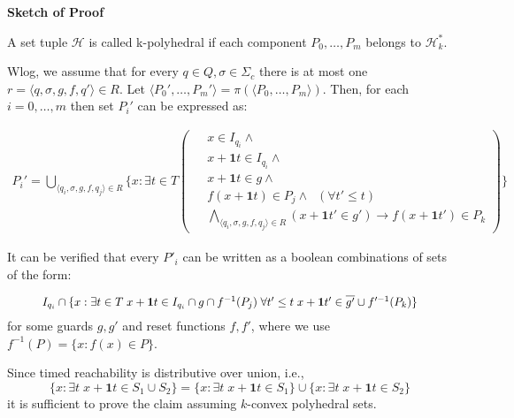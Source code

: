 \documentclass[table]{beamer}
\begin{document}
\begin{frame}
	\textbf{Sketch of Proof}
	
	\medskip

	A set tuple $\mathcal{H}$ is called k-polyhedral if each component $P_0,\ldots,P_m$ belongs to $\mathcal{H}^*_k$.

	Wlog, we assume that for every $q \in Q,\sigma \in \Sigma_c$ there is at most one $r=\langle q,\sigma,g,f,q'\rangle \in R$. Let $\langle P_0', \ldots, P_m'\rangle = \pi(\langle P_0, \ldots, P_m\rangle)$. Then, for each $i=0,\ldots,m$ then set $P_i'$ can be expressed as:

	\noindent 
	\begin{adjustbox}{max width=\textwidth}
	\parbox{\linewidth}{%
		\begin{align*}
			P_i' = \bigcup_{\langle q_i,\sigma,g,f,q_j\rangle \in R} \{x : \exists t \in T \left (
			\begin{aligned}
				\;&x \in I_{q_i} \land\\
				\;&x+\textbf{1}t \in I_{q_i} \land\\ 
				\;&x+\textbf{1}t \in g \land\\
				\;&f(x+\textbf{1}t) \in P_j \land \;\; (\forall t' \leq t)\\
				\;&\bigwedge_{\langle q_i,\sigma,g,f,q_j\rangle \in R}(x+\textbf{1}t' \in g')\rightarrow f(x+\textbf{1}t')\in P_k
			\end{aligned} \right ) \}
		\end{align*}
	}
	\end{adjustbox}
\end{frame}

\begin{frame}
	It can be verified that every $P'_i$ can be written as a boolean combinations of sets of the form:

	\begin{equation*}
		\resizebox{.9\hsize}{!}{
			$I_{q_i} \cap \{x : \exists t \in T \;  x+\textbf{1}t \in I_{q_i} \cap g \cap f^{-1}(P_j)\; \forall t' \leq t \; x+\textbf{1}t' \in \overline{g'} \cup f'^{-1}(P_k)\}$
		}
	\end{equation*}
	for some guards $g,g'$ and reset functions $f,f'$, where we use $f^{-1}(P)=\{x : f(x) \in P\}$.

	\medskip
	
	Since timed reachability is distributive over union, i.e.,
	$$\{x:\exists t\;x+\textbf{1}t \in S_1 \cup S_2\} = \{x:\exists t\;x+\textbf{1}t \in S_1\} \cup \{x:\exists t\;x+\textbf{1}t \in S_2\}$$
	it is sufficient to prove the claim assuming $k$-convex polyhedral sets.

\end{frame}
\end{document}
